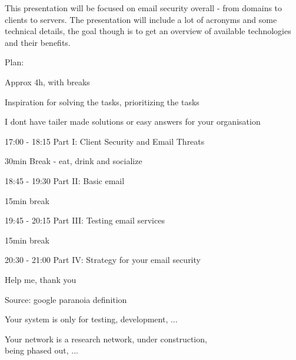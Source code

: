 \documentclass[Screen16to9,17pt]{foils}
\begin{document}




This presentation will be focused on email security overall - from domains to clients to servers. The presentation will include a lot of acronyms and some technical details, the goal though is to get an overview of available technologies and their benefits.




\begin{list2}
\item Plan:
\item Approx 4h, with breaks
\item Inspiration for solving the tasks, prioritizing the tasks
\item I dont have tailer made solutions or easy answers for your organisation
\end{list2}


\begin{list2}
\item[\faClockO] 17:00 - 18:15 Part I: Client Security and Email Threats
\item 30min Break - eat, drink and socialize
\item[\faClockO] 18:45 - 19:30 Part II: Basic email
\item 15min break
\item[\faClockO] 19:45 - 20:15 Part III: Testing email services
\item 15min break
\item[\faClockO] 20:30 - 21:00 Part IV: Strategy for your email security
\end{list2}

Help me, thank you




Source: google paranoia definition




Your system is only for testing, development, ...

Your network is a research network, under construction, \\
being phased out, ...
\end{document}

